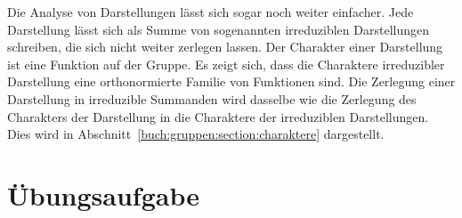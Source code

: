 Die Analyse von Darstellungen lässt sich sogar noch weiter einfacher.
Jede Darstellung lässt sich als Summe von sogenannten irreduziblen
Darstellungen schreiben, die sich nicht weiter zerlegen lassen.
Der Charakter einer Darstellung ist eine Funktion auf der Gruppe.
Es zeigt sich, dass die Charaktere irreduzibler Darstellung eine 
orthonormierte Familie von Funktionen sind.
Die Zerlegung einer Darstellung in irreduzible Summanden wird
dasselbe wie die Zerlegung des Charakters der Darstellung in die
Charaktere der irreduziblen Darstellungen.
Dies wird in Abschnitt~\ref{buch:gruppen:section:charaktere}
dargestellt.










\section*{Übungsaufgabe}
\begin{uebungsaufgaben}
\end{uebungsaufgaben}


